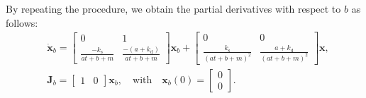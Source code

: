 By repeating the procedure, we obtain the partial derivatives with respect to $b$ as follows: 
\begin{equation} \begin{aligned} 
    & \dot{\mathbf{x}}_b = \begin{bmatrix} 0 & 1 \\ \frac{-k_{\mathrm{s}}}{a t + b + m} & \frac{-(a + k_{\mathrm{d}})}{a t + b + m} \end{bmatrix} \mathbf{x}_b 
    + \begin{bmatrix} 0 & 0 \\ \frac{k_{\mathrm{s}}}{(a t + b + m)^2} & \frac{a+k_{\mathrm{d}}}{(a t + b + m)^2} \end{bmatrix} \mathbf{x}  ,
 \\ & \mathbf{J}_b = \begin{bmatrix} 1 & 0 \end{bmatrix} \mathbf{x}_b, \quad \mathrm{with} \quad  \mathbf{x}_b(0) = \begin{bmatrix} 0 \\ 0 \end{bmatrix} . 
\end{aligned} \end{equation}

